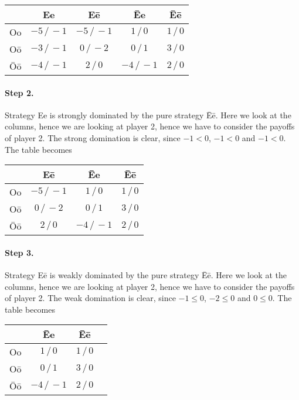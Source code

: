 \begin{enumerate}[label=\alph*.]
	      \begin{center}
	      	\begin{tabular}{c|cccc}
	      		       & Ee             & E\=e           & \=Ee           & \=E\=e       \\ \hline
	      		Oo     & $-5\, / \, -1$ & $-5\, / \, -1$ & $1\, / \, 0$   & $1\, / \, 0$ \\
	      		O\=o   & $-3\, / \, -1$ & $0\, / \, -2$  & $0\, / \, 1$   & $3\, / \, 0$ \\
	      		\=O\=o & $-4\, / \, -1$ & $2\, / \, 0$   & $-4\, / \, -1$ & $2\, / \, 0$
	      	\end{tabular}
	      \end{center}

	      \paragraph{Step 2.} Strategy Ee is strongly dominated by the pure strategy \=E\=e. Here we look at the columns, hence we are looking at player 2, hence we have to consider the payoffs of player 2. The strong domination is clear, since $-1 < 0$, $-1 < 0$ and $-1 < 0$.
	      The table becomes

	      \begin{center}
	      	\begin{tabular}{c|ccc}
	      		       & E\=e           & \=Ee           & \=E\=e       \\ \hline
	      		Oo     & $-5\, / \, -1$ & $1\, / \, 0$   & $1\, / \, 0$ \\
	      		O\=o   & $0\, / \, -2$  & $0\, / \, 1$   & $3\, / \, 0$ \\
	      		\=O\=o & $2\, / \, 0$   & $-4\, / \, -1$ & $2\, / \, 0$
	      	\end{tabular}
	      \end{center}

	      \paragraph{Step 3.} Strategy E\=e is weakly dominated by the pure strategy \=E\=e. Here we look at the columns, hence we are looking at player 2, hence we have to consider the payoffs of player 2. The weak domination is clear, since $-1 \leq 0$, $-2 \leq 0$ and $0 \leq 0$.
	      The table becomes

	      \begin{center}
	      	\begin{tabular}{c|ccc}
	      		       & \=Ee           & \=E\=e       \\ \hline
	      		Oo     & $1\, / \, 0$   & $1\, / \, 0$ \\
	      		O\=o   & $0\, / \, 1$   & $3\, / \, 0$ \\
	      		\=O\=o & $-4\, / \, -1$ & $2\, / \, 0$
	      	\end{tabular}
	      \end{center}


\end{enumerate}
